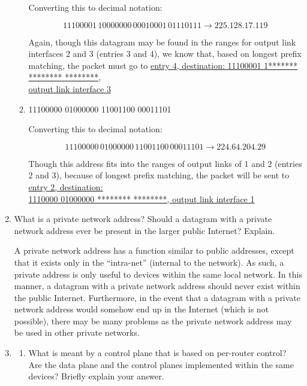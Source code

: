 \begin{enumerate}
\begin{enumerate}
        Converting this to decimal notation:

        $$11100001\, 10000000\, 00010001\, 01110111\longrightarrow 225.128.17.119$$

        Again, though this datagram may be found in the ranges for output link interfaces 2 and 3 (entries 3 and 4), we know that, based on longest prefix matching, the packet must go to \underline{entry 4, destination: 11100001 1******* ******** ********,}\\\underline{output link interface 3}

      \item 11100000 01000000 11001100 00011101

        Converting this to decimal notation:

        $$11100000\, 01000000\, 11001100\, 00011101\longrightarrow 224.64.204.29$$

        Though this address fits into the ranges of output links of 1 and 2 (entries 2 and 3), because of longest prefix matching, the packet will be sent to \underline{entry 2, destination:}\\\underline{1110000 01000000 ******** ********, output link interface 1}

    \end{enumerate}

  \item What is a private network address? Should a datagram with a private network address ever be present in the larger public Internet? Explain.

    A private network address has a function similar to public addresses, except that it exists only in the ``intra-net'' (internal to the network). As such, a private address is only useful to devices within the same local network. In this manner, a datagram with a private network address should never exist within the public Internet. Furthermore, in the event that a datagram with a private network address would somehow end up in the Internet (which is not possible), there may be many problems as the private network address may be used in other private networks.

  \item

    \begin{enumerate}

      \item What is meant by a control plane that is based on per-router control? Are the data plane and the control planes implemented within the same devices? Briefly explain your answer.


\end{enumerate}
\end{enumerate}
